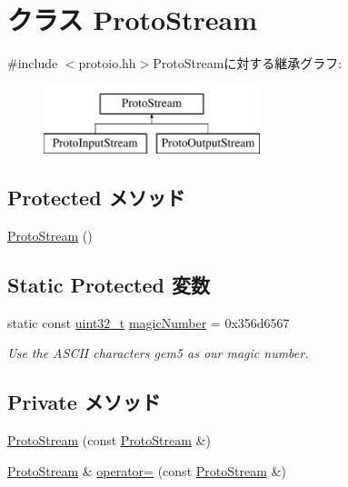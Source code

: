 \hypertarget{classProtoStream}{
\section{クラス ProtoStream}
\label{classProtoStream}
}


{\ttfamily \#include $<$protoio.hh$>$}ProtoStreamに対する継承グラフ:\begin{figure}[H]
\begin{center}
\leavevmode
\includegraphics[height=2cm]{classProtoStream}
\end{center}
\end{figure}
\subsection*{Protected メソッド}
\begin{DoxyCompactItemize}
\item 
\hyperlink{classProtoStream_ad731c8909fcb8114a4856bb8fe0f135e}{ProtoStream} ()
\end{DoxyCompactItemize}
\subsection*{Static Protected 変数}
\begin{DoxyCompactItemize}
\item 
static const \hyperlink{Type_8hh_a435d1572bf3f880d55459d9805097f62}{uint32\_\-t} \hyperlink{classProtoStream_aae89cf77af8ce1aad21e45dff2ea0e48}{magicNumber} = 0x356d6567
\begin{DoxyCompactList}\small\item\em Use the ASCII characters gem5 as our magic number. \item\end{DoxyCompactList}\end{DoxyCompactItemize}
\subsection*{Private メソッド}
\begin{Indent}{\bf }\par
{\em \label{_amgrpd41d8cd98f00b204e9800998ecf8427e}
 }\begin{DoxyCompactItemize}
\item 
\hyperlink{classProtoStream_a083fbbc25739ee13b2895a3db323a539}{ProtoStream} (const \hyperlink{classProtoStream}{ProtoStream} \&)
\item 
\hyperlink{classProtoStream}{ProtoStream} \& \hyperlink{classProtoStream_af18eb6f171e5994c12a349dcd5119b36}{operator=} (const \hyperlink{classProtoStream}{ProtoStream} \&)
\end{DoxyCompactItemize}
\end{Indent}


